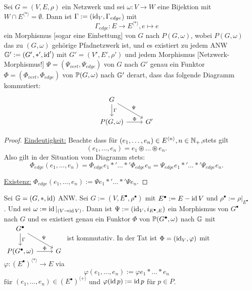 \begin{proposition}
    Sei $G=(V,E,\rho)$ ein Netzwerk und sei $\omega: V \to W$ eine Bijektion mit $W \cap E^{\langle\ast\rangle} = \emptyset$.
    Dann ist $\Gamma := (\id_V, \Gamma_{edge}$) mit 
    $$ \Gamma_{edge}: E \to E^{\langle\ast\rangle}, e \mapsto e $$ ein Morphismus [sogar eine Einbettung] von $G$ nach $P(G,\omega)$, wobei
    $P(G,\omega)$ das zu $(G,\omega)$ gehörige Pfadnetzwerk ist, und es existiert zu jedem ANW $\G':=(G',\ast',\id')$ mit
    $G'=(V',E',\rho')$ und jedem Morphismus [Netzwerk-Morphismus!]
    $ \Psi = (\Psi_{vert}, \Psi_{edge})$ von $G$ nach $G'$ genau ein Funktor $\Phi=(\Phi_{vert},\Phi_{edge})$ von 
    $\P(G,\omega)$ nach $\G'$ derart, dass das folgende Diagramm kommutiert:
    $$ \begin{tikzcd}
        \dar{\Gamma}G\drar{\Psi} &\\
        P(G,\omega) \rar{\Phi} & G'
    \end{tikzcd}$$
\end{proposition}
\begin{proof}
    \underline{Eindeutigkeit:} Beachte dass für $(e_1,\ldots,e_n) \in E^{\langle n\rangle}, n \in \N_+$,stets gilt
    $$  (e_1,\ldots, e_n) = e_1 \circledast \ldots \circledast e_n.$$
    Also gilt in der Situation vom Diagramm stets:
    $$ \Phi_{edge}(e_1, \ldots, e_n) = \Phi_{edge}e_1 \ast' \ldots \ast' \Phi_{edge}e_n = \Psi_{edge}e_1 \ast' \ldots \ast' \Psi_{edge} e_n.$$

    \underline{Existenz:} $ \Phi_{edge}(e_1,\ldots,e_n) := \Psi e_1 \ast' \ldots \ast' \Psi e_n$.
\end{proof}

\begin{bemerkung}
    Sei $\G = (G, \ast, \id)$ ANW. Sei $G := (V, E^\bullet, \rho^\bullet)$ mit $E^\bullet := E - \id V$ und
    $\rho^\bullet := \rho|_{E^\bullet}$. Und sei $\omega := \id|_{(V \to \id V)}$. Dann ist $\Psi:= (\id_V, i_{E^\bullet,E})$ ein 
    Morphismus von $G^\bullet$ nach $G$ und es existiert genau ein Funktor $\Phi$ von $\P(G^\bullet, \omega)$ nach $\G$ mit
    $\begin{tikzcd}
        G^\bullet \dar{\Gamma} \drar{\Psi}\\
        P(G^\bullet,\omega) \rar{\Phi} & G
    \end{tikzcd}$ ist kommutativ. In der Tat ist $\Phi=(\id_V, \varphi)$ mit $\varphi:(E^\bullet)^{\langle\ast\rangle} \to E$
    via $$\varphi(e_1, \ldots, e_n) := \varphi e_1 \ast \ldots \ast e_n$$
    für $(e_1, \ldots, e_n) \in (E^\bullet)^{\langle +\rangle}$ und $\varphi(\id p):= \id p$ für $p \in P$.
\end{bemerkung}

